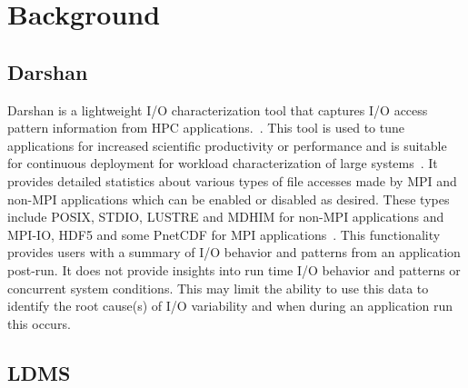 \section{Background}
\label{sec:background}
\subsection{Darshan}
Darshan is a lightweight I/O characterization tool that captures I/O access pattern information from HPC applications.~\cite{Darshan}.
This tool is used to tune applications for increased scientific productivity or performance and is suitable for continuous deployment for workload characterization of large systems~\cite{darshan-webpage}. It provides detailed statistics about various types of file accesses made by MPI and non-MPI applications which can be enabled or disabled as desired. These types include POSIX, STDIO, LUSTRE and MDHIM for non-MPI applications and MPI-IO, HDF5 and some PnetCDF for MPI applications~\cite{darshan-runtime}. This functionality provides users with a summary of I/O behavior and patterns from an application post-run. It does not provide insights into run time I/O behavior and patterns or concurrent system conditions. This may limit the ability to use this data to identify the root cause(s) of I/O variability and when during an application run this occurs. 

\subsection{LDMS}

